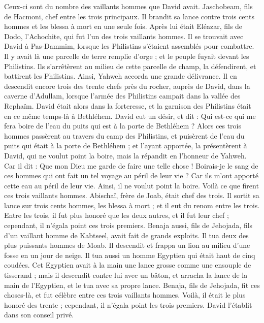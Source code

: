 \begin{multicols}{2}
Ceux-ci sont du nombre des vaillants hommes que David avait. Jaschobeam, fils de Hacmoni, chef entre les trois principaux. Il brandit sa lance contre trois cents hommes et les blessa à mort en une seule fois.
Après lui était Eléazar, fils de Dodo, l'Achochite, qui fut l’un des trois vaillants hommes.
Il se trouvait avec David à Pas-Dammim, lorsque les Philistins s'étaient assemblés pour combattre. Il y avait là une parcelle de terre remplie d'orge ; et le peuple fuyait devant les Philistins.
Ils s'arrêtèrent au milieu de cette parcelle de champ, la défendirent, et battirent les Philistins. Ainsi, Yahweh accorda une grande délivrance.
Il en descendit encore trois des trente chefs près du rocher, auprès de David, dans la caverne d'Adullam, lorsque l'armée des Philistins campait dans la vallée des Rephaïm.
David était alors dans la forteresse, et la garnison des Philistins était en ce même temps-là à Bethléhem.
David eut un désir, et dit : Qui est-ce qui me fera boire de l'eau du puits qui est à la porte de Bethléhem ?
Alors ces trois hommes passèrent au travers du camp des Philistins, et puisèrent de l'eau du puits qui était à la porte de Bethléhem ; et l'ayant apportée, la présentèrent à David, qui ne voulut point la boire, mais la répandit en l'honneur de Yahweh.
Car il dit : Que mon Dieu me garde de faire une telle chose ! Boirais-je le sang de ces hommes qui ont fait un tel voyage au péril de leur vie ? Car ils m'ont apporté cette eau au péril de leur vie. Ainsi, il ne voulut point la boire. Voilà ce que firent ces trois vaillants hommes.
Abischaï, frère de Joab, était chef des trois. Il sortit sa lance sur trois cents hommes, les blessa à mort ; et il eut du renom entre les trois.
Entre les trois, il fut plus honoré que les deux autres, et il fut leur chef ; cependant, il n'égala point ces trois premiers.
Benaja aussi, fils de Jehojada, fils d'un vaillant homme de Kabtseel, avait fait de grands exploits. Il tua deux des plus puissants hommes de Moab. Il descendit et frappa un lion au milieu d'une fosse en un jour de neige.
Il tua aussi un homme Egyptien qui était haut de cinq coudées. Cet Egyptien avait à la main une lance grosse comme une ensouple de tisserand ; mais il descendit contre lui avec un bâton, et arracha la lance de la main de l'Egyptien, et le tua avec sa propre lance.
Benaja, fils de Jehojada, fit ces choses-là, et fut célèbre entre ces trois vaillants hommes.
Voilà, il était le plus honoré des trente ; cependant, il n'égala point les trois premiers. David l'établit dans son conseil privé.

\end{multicols}

